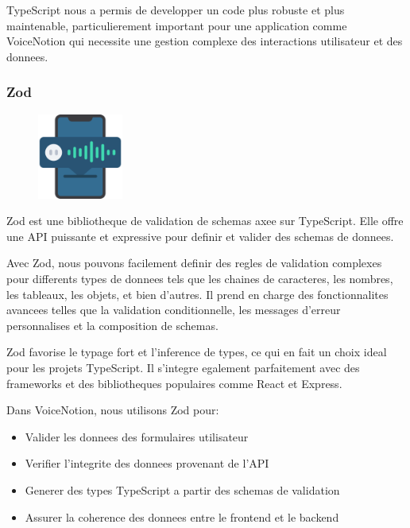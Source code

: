 TypeScript nous a permis de developper un code plus robuste et plus maintenable, particulierement important pour une application comme VoiceNotion qui necessite une gestion complexe des interactions utilisateur et des donnees.

\subsubsection{Zod}
\begin{figure}
    \centering
    \includegraphics[width=0.25\textwidth]{assets/docs/logo_zod.png}
\end{figure}
Zod est une bibliotheque de validation de schemas axee sur TypeScript. Elle offre une API puissante et expressive pour definir et valider des schemas de donnees. 

Avec Zod, nous pouvons facilement definir des regles de validation complexes pour differents types de donnees tels que les chaines de caracteres, les nombres, les tableaux, les objets, et bien d'autres. Il prend en charge des fonctionnalites avancees telles que la validation conditionnelle, les messages d'erreur personnalises et la composition de schemas.

Zod favorise le typage fort et l'inference de types, ce qui en fait un choix ideal pour les projets TypeScript. Il s'integre egalement parfaitement avec des frameworks et des bibliotheques populaires comme React et Express. 

Dans VoiceNotion, nous utilisons Zod pour:
\begin{itemize}
    \item Valider les donnees des formulaires utilisateur
    \item Verifier l'integrite des donnees provenant de l'API
    \item Generer des types TypeScript a partir des schemas de validation
    \item Assurer la coherence des donnees entre le frontend et le backend
\end{itemize}

